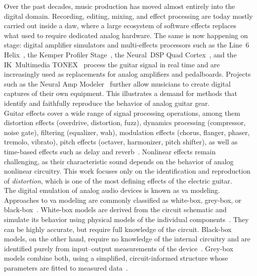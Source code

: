 Over the past decades, music production has moved almost entirely into the digital domain. Recording, editing, mixing, and effect processing are today mostly carried out inside a \acrfull{daw}, where a large ecosystem of software effects replaces what used to require dedicated analog hardware.
The same is now happening on stage: digital amplifier simulators and multi-effects processors such as the Line~6 Helix~\cite{line6helix}, the Kemper Profiler Stage~\cite{kemperprofiler}, the Neural~DSP Quad Cortex~\cite{neuraldspqc}, and the IK~Multimedia TONEX~\cite{iktonex} process the guitar signal in real time and are increasingly used as replacements for analog amplifiers and pedalboards. Projects such as the Neural Amp Modeler~\cite{atkinson_nam} further allow musicians to create digital captures of their own equipment. This illustrates a demand for methods that identify and faithfully reproduce the behavior of analog guitar gear.\\

Guitar effects cover a wide range of signal processing operations, among them distortion effects (overdrive, distortion, fuzz), dynamics processing (compressor, noise gate), filtering (equalizer, wah), modulation effects (chorus, flanger, phaser, tremolo, vibrato), pitch effects (octaver, harmonizer, pitch shifter), as well as time-based effects such as delay and reverb~\cite{zoelzer2011dafx}.  Nonlinear effects remain challenging, as their characteristic sound depends on the behavior of analog nonlinear circuitry. This work focuses only on the identification and reproduction of \emph{distortion}, which is one of the most defining effects of the electric guitar.\\


The digital emulation of analog audio devices is known as \acrfull{va} modeling. Approaches to \gls{va} modeling are commonly classified as white-box, grey-box, or black-box~\cite{vanhatalo2022review, comunita2025differentiable}. White-box models are derived from the circuit schematic and simulate its behavior using physical models of the individual components~\cite{wright2020realtime}. They can be highly accurate, but require full knowledge of the circuit. Black-box models, on the other hand, require no knowledge of the internal circuitry and are identified purely from input--output measurements of the device~\cite{wright2020realtime}. 
Grey-box models combine both, using a simplified, circuit-informed structure whose parameters are fitted to measured data~\cite{comunita2025differentiable}.\\


